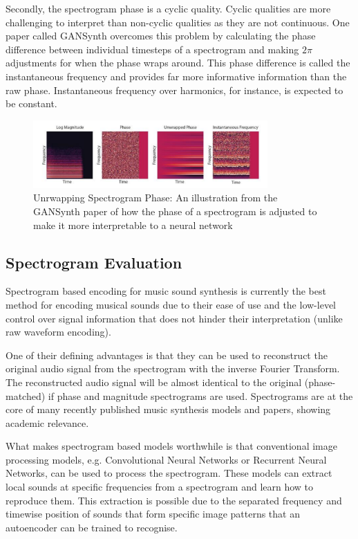 Secondly, the spectrogram phase is a cyclic quality. Cyclic qualities are more challenging to interpret than non-cyclic qualities as they are not continuous. One paper called GANSynth\cite{GANSynth} overcomes this problem by calculating the phase difference between individual timesteps of a spectrogram and making $2\pi$  adjustments for when the phase wraps around. This phase difference is called the instantaneous frequency and provides far more informative information than the raw phase. Instantaneous frequency over harmonics, for instance, is expected to be constant.

\begin{figure}[!ht]
    \centering
    \includegraphics[width=0.8\textwidth]{literature_review/PhaseAdjustment.png}
    \caption{Unrwapping Spectrogram Phase: An illustration from the GANSynth paper of how the phase of a spectrogram is adjusted to make it more interpretable to a neural network\cite{GANSynth}}
    \label{fig:phase_unwrapping}
\end{figure}

\subsection{Spectrogram Evaluation}

Spectrogram based encoding for music sound synthesis is currently the best method for encoding musical sounds due to their ease of use and the low-level control over signal information that does not hinder their interpretation (unlike raw waveform encoding).

One of their defining advantages is that they can be used to reconstruct the original audio signal from the spectrogram with the inverse Fourier Transform. The reconstructed audio signal will be almost identical to the original (phase-matched) if phase and magnitude spectrograms are used.
Spectrograms are at the core of many recently published music synthesis models and papers, showing academic relevance.

What makes spectrogram based models worthwhile is that conventional image processing models, e.g. Convolutional Neural Networks or Recurrent Neural Networks, can be used to process the spectrogram. These models can extract local sounds at specific frequencies from a spectrogram and learn how to reproduce them. This extraction is possible due to the separated frequency and timewise position of sounds that form specific image patterns that an autoencoder can be trained to recognise.

